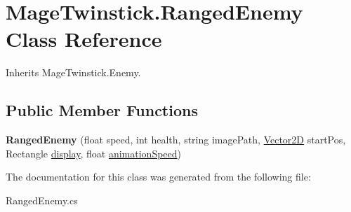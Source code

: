 \hypertarget{class_mage_twinstick_1_1_ranged_enemy}{}\section{Mage\+Twinstick.\+Ranged\+Enemy Class Reference}
\label{class_mage_twinstick_1_1_ranged_enemy}


Inherits Mage\+Twinstick.\+Enemy.

\subsection*{Public Member Functions}
\begin{DoxyCompactItemize}
\item 
\hypertarget{class_mage_twinstick_1_1_ranged_enemy_ac9144b929ee221ab7ed7e0e497edfef8}{}{\bfseries Ranged\+Enemy} (float speed, int health, string image\+Path, \hyperlink{class_mage_twinstick_1_1_vector2_d}{Vector2\+D} start\+Pos, Rectangle \hyperlink{class_mage_twinstick_1_1_game_object_a5807df7f837dc87c8955a008d0b27b50}{display}, float \hyperlink{class_mage_twinstick_1_1_game_object_a5d21c31402c27c5a19f2a62d98720456}{animation\+Speed})\label{class_mage_twinstick_1_1_ranged_enemy_ac9144b929ee221ab7ed7e0e497edfef8}

\end{DoxyCompactItemize}


The documentation for this class was generated from the following file\+:\begin{DoxyCompactItemize}
\item 
Ranged\+Enemy.\+cs\end{DoxyCompactItemize}
